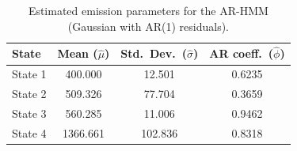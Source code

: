 \begin{table}[ht]
\centering
\begin{tabular}{lccc}
\hline
State & Mean ($\hat{\mu}$) & Std.\ Dev.\ ($\hat{\sigma}$) & AR coeff.\ ($\hat{\phi}$) \\
\hline
State 1 & 400.000 & 12.501 & 0.6235 \\
State 2 & 509.326 & 77.704 & 0.3659 \\
State 3 & 560.285 & 11.006 & 0.9462 \\
State 4 & 1366.661 & 102.836 & 0.8318 \\
\hline
\end{tabular}
\caption{Estimated emission parameters for the AR-HMM (Gaussian with AR(1) residuals).}
\label{tab:ar_hmm_emissions}
\end{table}
